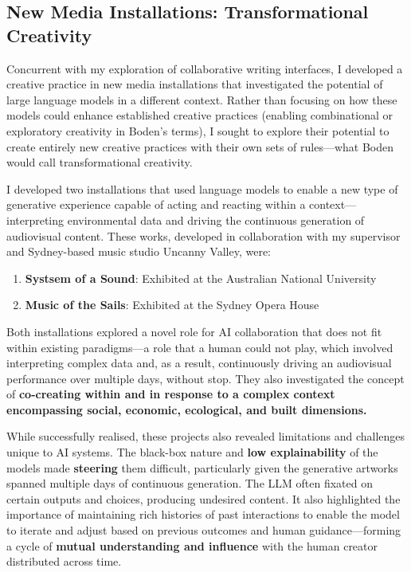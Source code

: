 \subsection{New Media Installations: Transformational Creativity}

Concurrent with my exploration of collaborative writing interfaces, I developed a creative practice in new media installations that investigated the potential of large language models in a different context. Rather than focusing on how these models could enhance established creative practices (enabling combinational or exploratory creativity in Boden's terms), I sought to explore their potential to create entirely new creative practices with their own sets of rules—what Boden would call transformational creativity.

I developed two installations that used language models to enable a new type of generative experience capable of acting and reacting within a context—interpreting environmental data and driving the continuous generation of audiovisual content. These works, developed in collaboration with my supervisor and Sydney-based music studio Uncanny Valley, were:

\begin{enumerate}
    \item \textbf{Systsem of a Sound}: Exhibited at the Australian National University
    \item \textbf{Music of the Sails}: Exhibited at the Sydney Opera House
\end{enumerate}

Both installations explored a novel role for AI collaboration that does not fit within existing paradigms—a role that a human could not play, which involved interpreting complex data and, as a result, continuously driving an audiovisual performance over multiple days, without stop. They also investigated the concept of \textbf{co-creating within and in response to a complex context encompassing social, economic, ecological, and built dimensions.}

While successfully realised, these projects also revealed limitations and challenges unique to AI systems. The black-box nature and \textbf{low explainability} of the models made \textbf{steering} them difficult, particularly given the generative artworks spanned multiple days of continuous generation. The LLM often fixated on certain outputs and choices, producing undesired content. It also highlighted the importance of maintaining rich histories of past interactions to enable the model to iterate and adjust based on previous outcomes and human guidance—forming a cycle of \textbf{mutual understanding and influence} with the human creator distributed across time.

